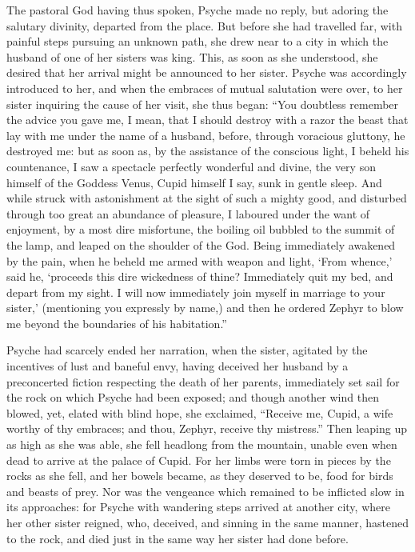 \documentclass[12pt]{article}
\begin{document}
The pastoral God having thus spoken, Psyche made no reply, but adoring the
salutary divinity, departed from the place. But before she had travelled far,
with painful steps pursuing an unknown path, she drew near to a city in which
the husband of one of her sisters was king. This, as soon as she understood,
she desired that her arrival might be announced to her sister. Psyche was
accordingly introduced to her, and when the embraces of mutual salutation were
over, to her sister inquiring the cause of her visit, she thus began: ``You
doubtless remember the advice you gave me, I mean, that I should destroy with a
razor the beast that lay with me under the name of a husband, before, through
voracious gluttony, he destroyed me: but as soon as, by the assistance of the
conscious light, I beheld his countenance, I saw a spectacle perfectly
wonderful and divine, the very son himself of the Goddess Venus, Cupid himself
I say, sunk in gentle sleep. And while struck with astonishment at the sight of
such a mighty good, and disturbed through too great an abundance of pleasure, I
laboured under the want of enjoyment, by a most dire misfortune, the boiling
oil bubbled to the summit of the lamp, and leaped on the shoulder of the God.
Being immediately awakened by the pain, when he beheld me armed with weapon and
light, `From whence,' said he, `proceeds this dire wickedness of thine?
Immediately quit my bed, and depart from my sight. I will now immediately join
myself in marriage to your sister,' (mentioning you expressly by name,) and
then he ordered Zephyr to blow me beyond the boundaries of his habitation.''

Psyche had scarcely ended her narration, when the sister, agitated by the
incentives of lust and baneful envy, having deceived her husband by a
preconcerted fiction respecting the death of her parents, immediately set sail
for the rock on which Psyche had been exposed; and though another wind then
blowed, yet, elated with blind hope, she exclaimed, ``Receive me, Cupid, a wife
worthy of thy embraces; and thou, Zephyr, receive thy mistress.'' Then leaping
up as high as she was able, she fell headlong from the mountain, unable even
when dead to arrive at the palace of Cupid. For her limbs were torn in pieces
by the rocks as she fell, and her bowels became, as they deserved to be, food
for birds and beasts of prey. Nor was the vengeance which remained to be
inflicted slow in its approaches: for Psyche with wandering steps arrived at
another city, where her other sister reigned, who, deceived, and sinning in the
same manner, hastened to the rock, and died just in the same way her sister had
done before.
\end{document}
